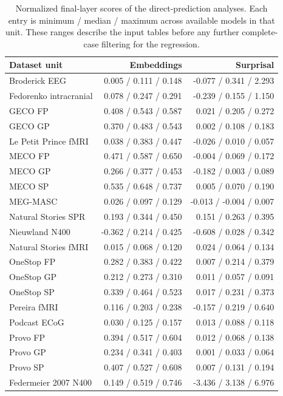 \begin{table}[p]
\centering\small
\caption{Normalized final-layer scores of the direct-prediction analyses. Each entry is minimum / median / maximum across available models in that unit. These ranges describe the input tables before any further complete-case filtering for the regression.}
\label{tab:score-ranges}
\begin{tabular}{lrr}
\toprule
Dataset unit & Embeddings & Surprisal\\
\midrule
Broderick EEG & 0.005 / 0.111 / 0.148 & -0.077 / 0.341 / 2.293 \\
Fedorenko intracranial & 0.078 / 0.247 / 0.291 & -0.239 / 0.155 / 1.150 \\
GECO FP & 0.408 / 0.543 / 0.587 & 0.021 / 0.205 / 0.272 \\
GECO GP & 0.370 / 0.483 / 0.543 & 0.002 / 0.108 / 0.183 \\
Le Petit Prince fMRI & 0.038 / 0.383 / 0.447 & -0.026 / 0.010 / 0.057 \\
MECO FP & 0.471 / 0.587 / 0.650 & -0.004 / 0.069 / 0.172 \\
MECO GP & 0.266 / 0.377 / 0.453 & -0.182 / 0.003 / 0.089 \\
MECO SP & 0.535 / 0.648 / 0.737 & 0.005 / 0.070 / 0.190 \\
MEG-MASC & 0.026 / 0.097 / 0.129 & -0.013 / -0.004 / 0.007 \\
Natural Stories SPR & 0.193 / 0.344 / 0.450 & 0.151 / 0.263 / 0.395 \\
Nieuwland N400 & -0.362 / 0.214 / 0.425 & -0.608 / 0.028 / 0.342 \\
Natural Stories fMRI & 0.015 / 0.068 / 0.120 & 0.024 / 0.064 / 0.134 \\
OneStop FP & 0.282 / 0.383 / 0.422 & 0.007 / 0.214 / 0.379 \\
OneStop GP & 0.212 / 0.273 / 0.310 & 0.011 / 0.057 / 0.091 \\
OneStop SP & 0.339 / 0.464 / 0.523 & 0.017 / 0.231 / 0.373 \\
Pereira fMRI & 0.116 / 0.203 / 0.238 & -0.157 / 0.219 / 0.640 \\
Podcast ECoG & 0.030 / 0.125 / 0.157 & 0.013 / 0.088 / 0.118 \\
Provo FP & 0.394 / 0.517 / 0.604 & 0.012 / 0.068 / 0.138 \\
Provo GP & 0.234 / 0.341 / 0.403 & 0.001 / 0.033 / 0.064 \\
Provo SP & 0.407 / 0.527 / 0.608 & 0.007 / 0.131 / 0.194 \\
Federmeier 2007 N400 & 0.149 / 0.519 / 0.746 & -3.436 / 3.138 / 6.976 \\

\end{tabular}
\end{table}
